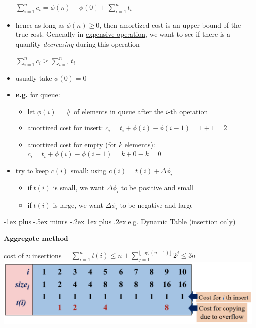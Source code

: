 \documentclass[10pt,landscape]{article}
\makeatletter
\newcommand{\subsubsubsection}{\@startsection{subsubsection}{3}{0mm}%
                                {-1ex plus -.5ex minus -.2ex}%
                                {1ex plus .2ex}%
                                {\normalfont\scriptsize\bfseries}}
\newcommand{\1}{\mathmybb{1}}
\newenvironment{tightcenter}{%
  \setlength\topsep{0pt}
  \setlength\parskip{0pt}
  \begin{center}
    }{%
  \end{center}
}
\makeatother
\begin{document}
\begin{multicols*}{3}
\begin{itemize}[topsep=0pt,noitemsep,wide=0pt, leftmargin=\dimexpr{} + 2\relax]
\begin{tightcenter}
      $\sum^n_{i=1} c_i = \phi(n) - \phi(0) + \sum^n_{i=1} t_i$
    \end{tightcenter}
  \item hence as long as $\phi(n) \geq 0$, then amortized cost is an upper bound of the true cost. Generally in \underline{expensive operation}, we want to see if there is a quantity \textit{decreasing} during this operation
    \begin{tightcenter}
      $\sum^n_{i=1} c_i \geq \sum^n_{i=1} t_i$
    \end{tightcenter}
  \item usually take $\phi(0) = 0$
  \item \textbf{e.g.} for queue:
    \begin{itemize}[topsep=0pt,noitemsep,wide=0pt, leftmargin=\dimexpr{} + 2\relax]
      \item let $\phi(i)$ = \# of elements in queue after the $i$-th operation
      \item amortized cost for insert: $c_i = t_i + \phi(i) - \phi(i-1) = 1 + 1 = 2$
      \item amortized cost for empty (for $k$ elements): $c_i = t_i + \phi(i) - \phi(i-1) = k + 0 - k = 0 $
    \end{itemize}
  \item try to keep $c(i)$ small: using $c(i) = t(i) + \Delta \phi_i$
    \begin{itemize}[topsep=0pt,noitemsep,wide=0pt, leftmargin=\dimexpr{} + 2\relax]
      \item if $t(i)$ is small, we want $\Delta \phi_i$ to be positive and small
      \item if $t(i)$ is large, we want $\Delta \phi_i$ to be negative and large 
    \end{itemize}
\end{itemize}

\subsubsubsection{e.g. Dynamic Table (insertion only)}

\textbf{Aggregate method}

\begin{tightcenter}
  cost of $n$ insertions = $\sum^n_{i=1} t(i) \leq n + \sum^{ \lfloor \log(n-1) \rfloor  }_{j=1} 2^j \leq 3n$
  \includegraphics[width=0.95\linewidth]{images/aggregate.png} 
\end{tightcenter}


\end{multicols*}
\end{document}
